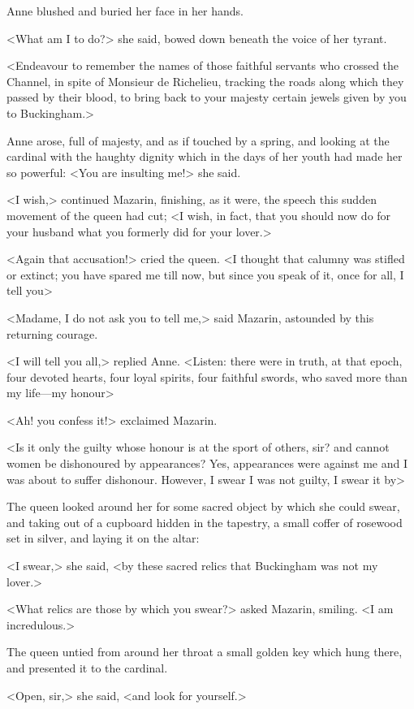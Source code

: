 Anne blushed and buried her face in her hands.

<What am I to do?> she said, bowed down beneath the voice of her tyrant.

<Endeavour to remember the names of those faithful servants who crossed the Channel, in spite of Monsieur de Richelieu, tracking the roads along which they passed by their blood, to bring back to your majesty certain jewels given by you to Buckingham.>

Anne arose, full of majesty, and as if touched by a spring, and looking at the cardinal with the haughty dignity which in the days of her youth had made her so powerful: <You are insulting me!> she said.

<I wish,> continued Mazarin, finishing, as it were, the speech this sudden movement of the queen had cut; <I wish, in fact, that you should now do for your husband what you formerly did for your lover.>

<Again that accusation!> cried the queen. <I thought that calumny was stifled or extinct; you have spared me till now, but since you speak of it, once for all, I tell you\longdash>

<Madame, I do not ask you to tell me,> said Mazarin, astounded by this returning courage.

<I will tell you all,> replied Anne. <Listen: there were in truth, at that epoch, four devoted hearts, four loyal spirits, four faithful swords, who saved more than my life—my honour\longdash>

<Ah! you confess it!> exclaimed Mazarin.

<Is it only the guilty whose honour is at the sport of others, sir? and cannot women be dishonoured by appearances? Yes, appearances were against me and I was about to suffer dishonour. However, I swear I was not guilty, I swear it by\longdash>

The queen looked around her for some sacred object by which she could swear, and taking out of a cupboard hidden in the tapestry, a small coffer of rosewood set in silver, and laying it on the altar:

<I swear,> she said, <by these sacred relics that Buckingham was not my lover.>

<What relics are those by which you swear?> asked Mazarin, smiling. <I am incredulous.>

The queen untied from around her throat a small golden key which hung there, and presented it to the cardinal.

<Open, sir,> she said, <and look for yourself.>

